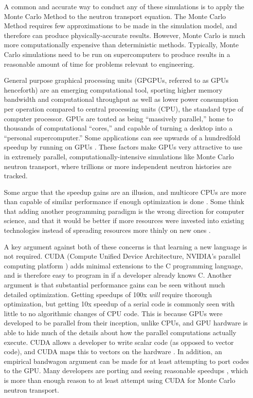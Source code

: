 A common and accurate way to conduct any of these simulations is to apply the Monte Carlo Method to the neutron transport equation.  The Monte Carlo Method requires few approximations to be made in the simulation model, and therefore can produce physically-accurate results.  However, Monte Carlo is much more computationally expensive than deterministic methods.  Typically, Monte Carlo simulations need to be run on supercomputers to produce results in a reasonable amount of time for problems relevant to engineering.

General purpose graphical processing units (GPGPUs, referred to as GPUs henceforth) are an emerging computational tool, sporting higher memory bandwidth and computational throughput as well as lower power consumption per operation compared to central processing units (CPU), the standard type of computer processor.  GPUs are touted as being ``massively parallel,'' home to thousands of computational ``cores,'' and capable of turning a desktop into a ``personal supercomputer.''  Some applications can see upwards of a hundredfold speedup by running on GPUs \cite{nvidia_speedups}. These factors make GPUs very attractive to use in extremely parallel, computationally-intensive simulations like Monte Carlo neutron transport, where trillions or more independent neutron histories are tracked.   

Some argue that the speedup gains are an illusion, and multicore CPUs are more than capable of similar performance if enough optimization is done \cite{debunk}. Some think that adding another programming paradigm is the wrong direction for computer science, and that it would be better if more resources were invested into existing technologies instead of spreading resources more thinly on new ones \cite{fewer_lang}.  

A key argument against both of these concerns is that learning a new language is not required. CUDA (Compute Unified Device Architecture, NVIDIA's parallel computing platform \cite{cuda}) adds minimal extensions to the C programming language, and is therefore easy to program in if a developer already knows C. Another argument is that substantial performance gains can be seen without much detailed optimization.  Getting speedups of 100x \emph{will} require thorough optimization, but getting 10x speedup of a serial code is commonly seen with little to no algorithmic changes of CPU code.  This is because GPUs were developed to be parallel from their inception, unlike CPUs, and GPU hardware is able to hide much of the details about how the parallel computations actually execute.  CUDA allows a developer to write scalar code (as opposed to vector code), and CUDA maps this to vectors on the hardware \cite{cuda}.  In addition, an empirical  bandwagon argument can be made for at least attempting to port codes to the GPU.  Many developers are porting and seeing reasonable speedups \cite{nvidia_speedups}, which is more than enough reason to at least attempt using CUDA for Monte Carlo neutron transport. 

